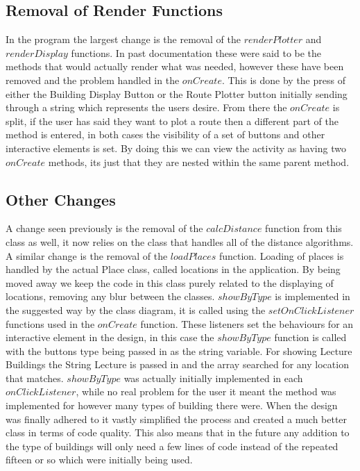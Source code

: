 \subsection{Removal of Render Functions}
In the program the largest change is the removal of the $renderPlotter$ and $renderDisplay$ functions. In past documentation these were said to be the methods that would actually render what was needed, however these have been removed and the problem handled in the $onCreate$. This is done by the press of either the Building Display Button or the Route Plotter button initially sending through a string which represents the users desire. From there the $onCreate$ is split, if the user has said they want to plot a route then a different part of the method is entered, in both cases the visibility of a set of buttons and other interactive elements is set. By doing this we can view the activity as having two $onCreate$ methods, its just that they are nested within the same parent method. 
\subsection{Other Changes}
A change seen previously is the removal of the $calcDistance$ function from this class as well, it now relies on the class that handles all of the distance algorithms. A similar change is the removal of the $loadPlaces$ function. Loading of places is handled by the actual Place class, called locations in the application. By being moved away we keep the code in this class purely related to the displaying of locations, removing any blur between the classes. $showByType$ is implemented in the suggested way by the class diagram, it is called using the $setOnClickListener$ functions used in the $onCreate$ function. These listeners set the behaviours for an interactive element in the design, in this case the $showByType$ function is called with the buttons type being passed in as the string variable. For showing Lecture Buildings the String Lecture is passed in and the array searched for any location that matches. $showByType$ was actually initially implemented in each $onClickListener$, while no real problem for the user it meant the method was implemented for however many types of building there were. When the design was finally adhered to it vastly simplified the process and created a much better class in terms of code quality. This also means that in the future any addition to the type of buildings will only need a few lines of code instead of the repeated fifteen or so which were initially being used. 

